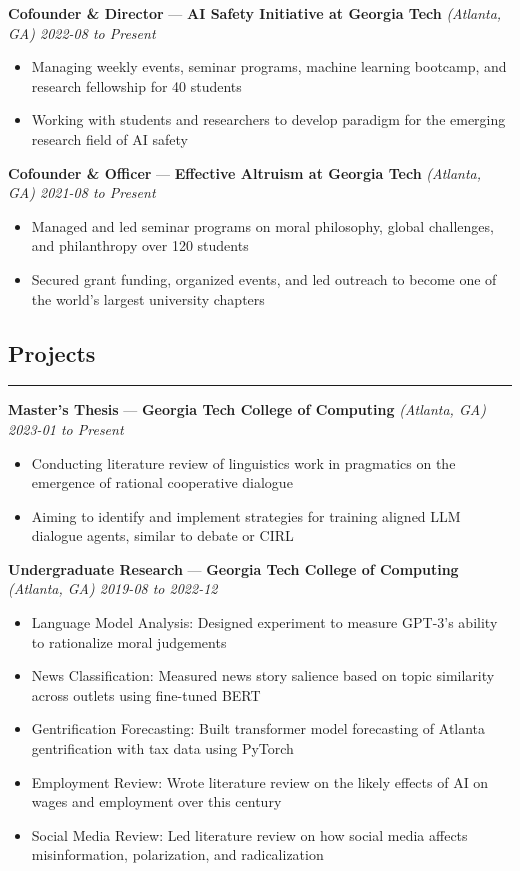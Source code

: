 \documentclass[10pt]{article}
\newcommand{\resumeHeading}[1]{
    \subsection*{#1}
    \hrule
    \vspace*{5pt}
}
\newcommand{\resumeSubHeading}[5]{
    \vspace*{5pt}
    \textbf{#1} — \textbf{#2} \textsl{(#3) \hfill #4 to #5}
}
\begin{document}
\resumeSubHeading
    {Cofounder \& Director}
    {AI Safety Initiative at Georgia Tech}
    {Atlanta, GA}
    {2022-08}
    {Present}
    \begin{itemize}
        \item Managing weekly events, seminar programs, machine learning bootcamp, and research fellowship for 40 students
        \item Working with students and researchers to develop paradigm for the emerging research field of AI safety
\end{itemize}

\resumeSubHeading
    {Cofounder \& Officer}
    {Effective Altruism at Georgia Tech}
    {Atlanta, GA}
    {2021-08}
    {Present}
\begin{itemize}
    \item Managed and led seminar programs on moral philosophy, global challenges, and philanthropy over 120 students
    \item Secured grant funding, organized events, and led outreach to become one of the world's largest university chapters
\end{itemize}



\resumeHeading{Projects \vspace{-2.5pt}}

\resumeSubHeading
    {Master's Thesis}
    {Georgia Tech College of Computing}
    {Atlanta, GA}
    {2023-01}
    {Present}
\begin{itemize}
    \item Conducting literature review of linguistics work in pragmatics on the emergence of rational cooperative dialogue
    \item Aiming to identify and implement strategies for training aligned LLM dialogue agents, similar to debate or CIRL
\end{itemize}

\resumeSubHeading
    {Undergraduate Research}
    {Georgia Tech College of Computing}
    {Atlanta, GA}
    {2019-08}
    {2022-12}
\begin{itemize}
    \item Language Model Analysis:
        Designed experiment to measure GPT-3's ability to rationalize moral judgements
    \item News Classification:
        Measured news story salience based on topic similarity across outlets using fine-tuned BERT
    \item Gentrification Forecasting:
        Built transformer model forecasting of Atlanta gentrification with tax data using PyTorch
    \item Employment Review:
        Wrote literature review on the likely effects of AI on wages and employment over this century
    \item Social Media Review:
        Led literature review on how social media affects misinformation, polarization, and radicalization
\end{itemize}
\end{document}
